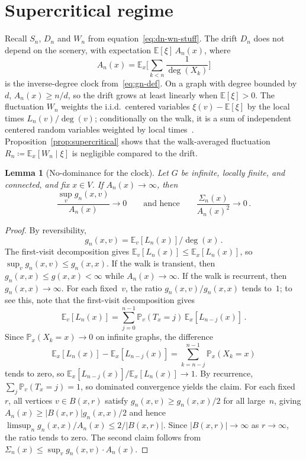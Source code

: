 \documentclass[aop]{imsart}
\theoremstyle{plain}
\newtheorem{lemma}[theorem]{Lemma}
\theoremstyle{definition}
\newcommand{\E}{\mathbb{E}}
\renewcommand{\P}{\mathbb{P}}
\begin{document}
	\section{Supercritical regime}\label{sec:supercritical}
	
	Recall $S_n$, $D_n$ and $W_n$ from equation~\eqref{eq:dn-wn-stuff}.
	The drift $D_n$ does not depend on the scenery, with expectation $\E[\xi]\,A_n(x)$, where
	\[
	A_n(x)=\E_x\biggl[\sum_{k<n}\frac{1}{\deg(X_k)}\biggr]
	\]
	is the inverse-degree clock from~\eqref{eq:gn-def}. On a graph with degree bounded by~$d$, $A_n(x)\geq n/d$, so the drift grows at least linearly when $\E[\xi]>0$. The fluctuation $W_n$ weights the i.i.d.\ centered variables $\xi(v)-\E[\xi]$ by the local times $L_n(v)/\deg(v)$; conditionally on the walk, it is a sum of independent centered random variables weighted by local times~\citep{KestenSpitzer79}. Proposition~\ref{prop:supercritical} shows that the walk-averaged fluctuation $R_n\coloneqq\E_x[W_n\mid\xi]$ is negligible compared to the drift.
	
	\begin{lemma}[No-dominance for the clock]\label{lem:clock-no-dom}
		Let $G$ be infinite, locally finite, and connected, and fix $x\in V$. If $A_n(x)\to\infty$, then
		\[
		\frac{\sup_v g_n(x,v)}{A_n(x)}\to 0\qquad\text{and hence}\qquad\frac{\Sigma_n(x)}{A_n(x)^2}\to 0\,.
		\]
	\end{lemma}
	\begin{proof}
		By reversibility,
		\[
		g_n(x,v)=\E_v[L_n(x)]/\deg(x)\,.
		\]
		The first-visit decomposition gives $\E_v[L_n(x)]\leq\E_x[L_n(x)]$, so $\sup_v g_n(x,v)\leq g_n(x,x)$.
		If the walk is transient, then $g_n(x,x)\leq g(x,x)<\infty$ while $A_n(x)\to\infty$. If the walk is recurrent, then $g_n(x,x)\to\infty$. For each fixed~$v$, the ratio $g_n(x,v)/g_n(x,x)$ tends to~$1$; to see this, note that the first-visit decomposition gives
		\[
		\E_v[L_n(x)]=\sum_{j=0}^{n-1}\P_v(T_x=j)\,\E_x[L_{n-j}(x)]\,.
		\]
		Since $\P_x(X_k=x)\to 0$ on infinite graphs, the difference
		\[
		\E_x[L_n(x)]-\E_x[L_{n-j}(x)]=\sum_{k=n-j}^{n-1}\P_x(X_k=x)
		\]
		tends to zero, so $\E_x[L_{n-j}(x)]/\E_x[L_n(x)]\to 1$. By recurrence, $\sum_j\P_v(T_x=j)=1$, so dominated convergence yields the claim. For each fixed~$r$, all vertices $v\in B(x,r)$ satisfy $g_n(x,v)\geq g_n(x,x)/2$ for all large~$n$, giving $A_n(x)\geq|B(x,r)|g_n(x,x)/2$ and hence $\limsup_n g_n(x,x)/A_n(x)\leq 2/|B(x,r)|$. Since $|B(x,r)|\to\infty$ as $r\to\infty$, the ratio tends to zero. The second claim follows from $\Sigma_n(x)\leq\sup_v g_n(x,v)\cdot A_n(x)$.
	\end{proof}
	
\end{document}
